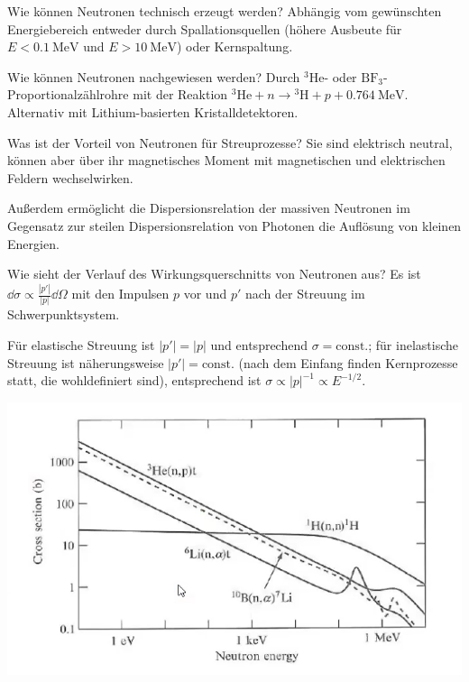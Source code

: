 \begin{fquestion}{Wie können Neutronen technisch erzeugt werden?}
    Abhängig vom gewünschten Energiebereich entweder durch Spallationsquellen (höhere Ausbeute für $E < \SI{0.1}{\mega\electronvolt}$ und $E>\SI{10}{\mega\electronvolt}$) oder Kernspaltung.
\end{fquestion}

\begin{fquestion}{Wie können Neutronen nachgewiesen werden?}
    Durch ${}^3\text{He}$- oder $\text{BF}_3$-Proportionalzählrohre mit der Reaktion ${}^3\text{He} + n \rightarrow {}^3\text{H} + p + \SI{0.764}{\mega\electronvolt}$.
    Alternativ mit Lithium-basierten Kristalldetektoren.
\end{fquestion}

\begin{fquestion}{Was ist der Vorteil von Neutronen für Streuprozesse?}
    Sie sind elektrisch neutral, können aber über ihr magnetisches Moment mit magnetischen und elektrischen Feldern wechselwirken.
    
    Außerdem ermöglicht die Dispersionsrelation der massiven Neutronen im Gegensatz zur steilen Dispersionsrelation von Photonen die Auflösung von kleinen Energien. 
\end{fquestion}

\begin{fquestion}{Wie sieht der Verlauf des Wirkungsquerschnitts von Neutronen aus?}
    Es ist $\dd \sigma \propto \frac{|p'|}{|p|} \dd \Omega$ mit den Impulsen $p$ vor und $p'$ nach der Streuung im Schwerpunktsystem.
    
    Für elastische Streuung ist $|p'| = |p|$ und entsprechend $\sigma = \mathrm{const.}$; für inelastische Streuung ist näherungsweise $|p'| = \mathrm{const.}$ (nach dem Einfang finden Kernprozesse statt, die wohldefiniert sind), entsprechend ist $\sigma \propto |p|^{-1} \propto E^{-1/2}$.
    
    \begin{center}
        \includegraphics[width=.8\linewidth]{img/Crosssection_Neutron.png}
    \end{center}
\end{fquestion}

